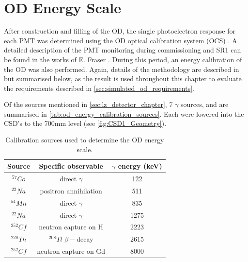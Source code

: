 \section{OD Energy Scale} \label{sec:od_energy_scale}
\par
After construction and filling of the OD, the single photoelectron response for each PMT was determined using the OD optical calibration system (OCS) \cite{lz_ocs_system_ref}.
A detailed description of the PMT monitoring during commissioning and SR1 can be found in the works of E. Fraser \cite{ewanfraser_thesis_ref}. 
During this period, an energy calibration of the OD was also performed.
Again, details of the methodology are described in \cite{ewanfraser_thesis_ref} but summarised below, as the result is used throughout this chapter to evaluate the requirements described in \autoref{sec:simulated_od_requirements}.
\par
Of the sources mentioned in \autoref{sec:lz_detector_chapter}, 7 $\gamma$ sources, and are summarised in \autoref{tab:od_energy_calibration_sources}.
Each were lowered into the CSD's to the 700mm level (see \autoref{fig:CSD1_Geometry}).

\begin{table}[!htbp]%
    \centering
    \begin{tabular}{c|c|c}
        Source      & Specific observable         &  $\gamma$ energy (keV) \\ \hline
        ${}^{57}Co$ & direct $\gamma$             & 122                        \\
        ${}^{22}Na$ & positron annihilation       & 511               \\
        ${}^{54}Mn$ & direct $\gamma$             & 835                        \\
        ${}^{22}Na$ & direct $\gamma$             & 1275               \\
        ${}^{252}Cf$ & neutron capture on H       & 2223            \\
        ${}^{228}Th$ & ${}^{208}Tl$ $\beta-$decay & 2615            \\
        ${}^{252}Cf$ & neutron capture on Gd      & 8000            
        
    \end{tabular}
    \caption{Calibration sources used to determine the OD energy scale.}
    \label{tab:od_energy_calibration_sources}
\end{table}

